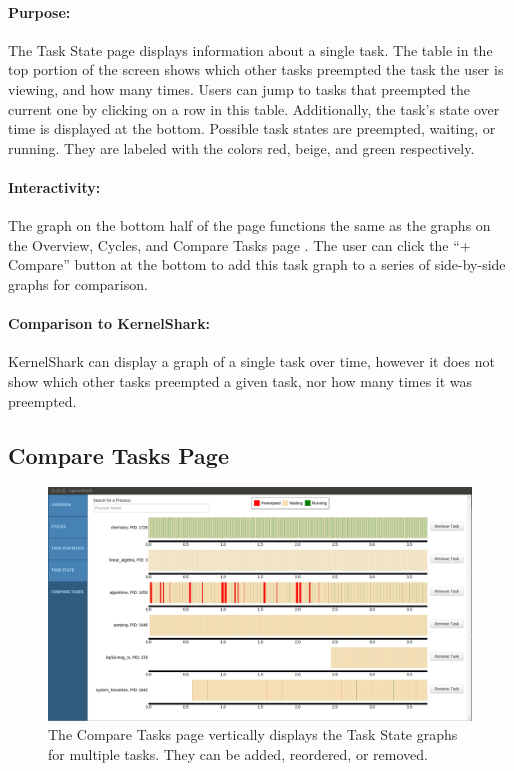 \documentclass{hmcclinic}
\begin{document}
\paragraph{Purpose:}
    The Task State page displays information about a single task. The table in the top portion of the screen shows which other tasks preempted the task the user is viewing, and how many times. Users can jump to tasks that preempted the current one by
    clicking on a row in this table. Additionally, the task's state over time
    is displayed at the bottom. Possible task states are preempted, waiting, or
    running. They are labeled with the colors red, beige, and green respectively. 

\paragraph{Interactivity:}
    The graph on the bottom half of the page functions the same as the graphs on
    the Overview, Cycles, and Compare Tasks page
    . The user can click the ``+ Compare'' button at the bottom
    to add this task graph to a series of side-by-side graphs for comparison.
    
\paragraph{Comparison to KernelShark:}
     KernelShark can display a graph of a single task over time, however it does not show which other tasks preempted a given task, nor how many times it was preempted.
  
  \subsection{Compare Tasks Page}
  
  \begin{figure}[H]
  \includegraphics[scale=0.3]{compare-page.png}
  \caption{The Compare Tasks page vertically displays the Task State graphs for
  multiple tasks. They can be added, reordered, or removed.}
  \end{figure}
\end{document}
